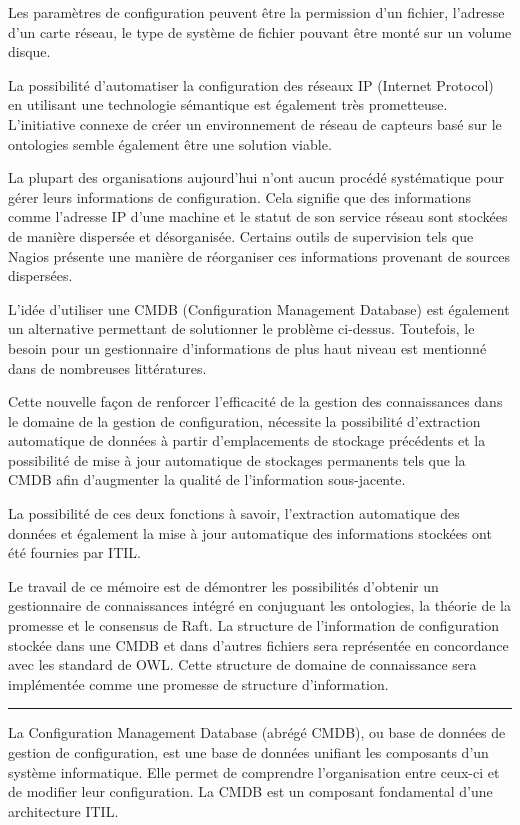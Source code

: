 Les paramètres de configuration peuvent être la permission d'un fichier,
l'adresse d'un carte réseau, le type de système de fichier pouvant être monté
sur un volume disque.

La possibilité d'automatiser la configuration des réseaux IP (Internet
Protocol) en utilisant une technologie sémantique est également très
prometteuse. L'initiative connexe de créer un environnement de réseau de
capteurs basé sur le ontologies semble également être une solution viable.

La plupart des organisations aujourd'hui n'ont aucun procédé systématique pour
gérer leurs informations de configuration. Cela signifie que des informations
comme l'adresse IP d'une machine et le statut de son service réseau sont
stockées de manière dispersée et désorganisée. Certains outils de supervision
tels que Nagios présente une manière de réorganiser ces informations provenant
de sources dispersées.

L'idée d'utiliser une CMDB (Configuration Management Database) est également un
alternative permettant de solutionner le problème ci-dessus. Toutefois, le besoin
pour un gestionnaire d'informations de plus haut niveau est mentionné dans de
nombreuses littératures.

Cette nouvelle façon de renforcer l'efficacité de la gestion des connaissances
dans le domaine de la gestion de configuration, nécessite la possibilité
d'extraction automatique de données à partir d'emplacements de stockage
précédents et la possibilité de mise à jour automatique de stockages permanents
tels que la CMDB afin d'augmenter la qualité de l'information sous-jacente.

La possibilité de ces deux fonctions à savoir, l'extraction automatique des
données et également la mise à jour automatique des informations stockées ont
été fournies par ITIL. %

Le travail de ce mémoire est de démontrer les possibilités d'obtenir un
gestionnaire de connaissances intégré en conjuguant les ontologies, la théorie
de la promesse et le consensus de Raft. La structure de l'information de
configuration stockée dans une CMDB et dans d'autres fichiers sera représentée en
concordance avec les standard de OWL. Cette structure de domaine de connaissance
sera implémentée comme une promesse de structure d'information.

\noindent\rule{8cm}{0.4pt}

La Configuration Management Database (abrégé CMDB), ou base de données de
gestion de configuration, est une base de données unifiant les composants d'un
système informatique. Elle permet de comprendre l'organisation entre ceux-ci et
de modifier leur configuration. La CMDB est un composant fondamental d'une
architecture ITIL.

